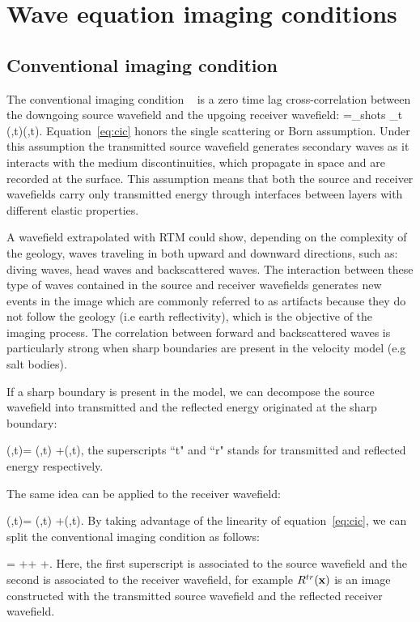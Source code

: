 \section{Wave equation imaging conditions}

\subsection{Conventional imaging condition}
The conventional imaging condition ~\citep{Claerbout:1985:IEI:3887}
is a zero time lag cross-correlation between the downgoing source wavefield and the upgoing 
receiver wavefield:
%
\beq
\R=\sum_{shots} \sum_{t} \US(\xx,t)\UR(\xx,t).
\label{eq:cic}
\eeq
%
 Equation~\ref{eq:cic} honors the single scattering or Born assumption. Under this assumption the transmitted
source wavefield generates secondary waves as it interacts with the medium discontinuities, which propagate in 
space and are recorded at the surface. This assumption means that both the source and receiver
wavefields carry only transmitted energy through interfaces between layers with different elastic properties.

A wavefield extrapolated with RTM could show, depending on the complexity of the geology, waves traveling in both
upward and downward directions, such as: diving waves, head waves and backscattered waves. The interaction between
 these type of waves contained in the source and receiver wavefields generates new events in the image which are 
commonly referred to as artifacts because they do not follow the geology (i.e earth reflectivity), which is the objective 
of the imaging process. The correlation between forward and backscattered waves is particularly strong when
sharp boundaries are present in the velocity model (e.g salt bodies).

If a sharp boundary is present in the model, we can decompose the source wavefield into transmitted 
 and the reflected energy originated at the sharp boundary:

\beq
\US(\xx,t)= \USr(\xx,t) +\USt(\xx,t),
\label{eq:ssplit}
\eeq
%
the superscripts ``t" and ``r" stands for transmitted and reflected energy respectively. 

The same idea can be applied to the receiver wavefield:

\beq
\UR(\xx,t)= \URr(\xx,t) +\URt(\xx,t).
\label{eq:rsplit}
\eeq
%
By taking advantage of the linearity of equation~\ref{eq:cic},  we
can split the conventional imaging condition as follows:

\beq
\R= ++  +.
\label{eq:cicsplit}
\eeq
%
Here, the first superscript is associated to the source wavefield and the second is associated to the
receiver wavefield, for example $R^{tr}({\bf x})$ is an image constructed with the transmitted source wavefield
and the reflected receiver wavefield.

